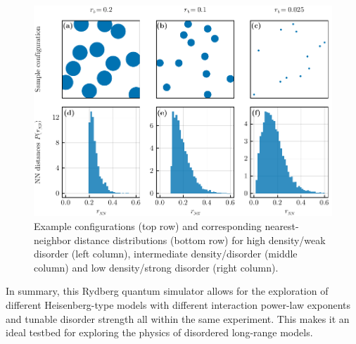 \begin{figure}[htb]
	\centering
	\includegraphics[width=\textwidth]{gfx/part1/disorder-in-experiment}
	\caption{Example configurations (top row) and corresponding nearest-neighbor distance distributions (bottom row) for high density/weak disorder (left column), intermediate density/disorder (middle column) and low density/strong disorder (right column).}
	\label{fig:disorder-distribution}
\end{figure}

In summary, this Rydberg quantum simulator allows for the exploration of different Heisenberg-type models with different interaction power-law exponents and tunable disorder strength all within the same experiment. This makes it an ideal testbed for exploring the physics of disordered long-range models.
